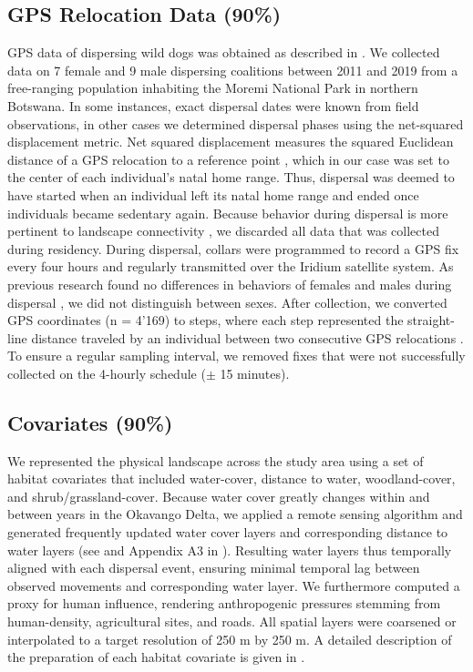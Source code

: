 \documentclass[abstract=on,10pt,a4paper,bibliography=totocnumbered]{article}
\begin{document}
\subsection{GPS Relocation Data (90\%)}
GPS data of dispersing wild dogs was obtained as described in \citep{Cozzi.2020,
Hofmann.2021}. We collected data on 7 female and 9 male dispersing coalitions
between 2011 and 2019 from a free-ranging population inhabiting the Moremi
National Park in northern Botswana. In some instances, exact dispersal dates
were known from field observations, in other cases we determined dispersal
phases using the net-squared displacement metric. Net squared displacement
measures the squared Euclidean distance of a GPS relocation to a reference point
\citep{Borger.2012}, which in our case was set to the center of each
individual's natal home range. Thus, dispersal was deemed to have started when
an individual left its natal home range and ended once individuals became
sedentary again. Because behavior during dispersal is more pertinent to
landscape connectivity \citep{Elliot.2014, Abrahms.2017}, we discarded all data
that was collected during residency. During dispersal, collars were programmed
to record a GPS fix every four hours and regularly transmitted over the Iridium
satellite system. As previous research found no differences in behaviors of
females and males during dispersal \citep{Woodroffe.2019, Cozzi.2020}, we did
not distinguish between sexes. After collection, we converted GPS coordinates (n
= 4'169) to steps, where each step represented the straight-line distance
traveled by an individual between two consecutive GPS relocations
\citep{Turchin.1998}. To ensure a regular sampling interval, we removed fixes
that were not successfully collected on the 4-hourly schedule (\( \pm \) 15
minutes).

\subsection{Covariates (90\%)}
We represented the physical landscape across the study area using a set of
habitat covariates that included water-cover, distance to water, woodland-cover,
and shrub/grassland-cover. Because water cover greatly changes within and
between years in the Okavango Delta, we applied a remote sensing algorithm and
generated frequently updated water cover layers and corresponding distance to
water layers (see \citealp{Wolski.2017} and Appendix A3 in
\citealp{Hofmann.2021}). Resulting water layers thus temporally aligned with
each dispersal event, ensuring minimal temporal lag between observed movements
and corresponding water layer. We furthermore computed a proxy for human
influence, rendering anthropogenic pressures stemming from human-density,
agricultural sites, and roads. All spatial layers were coarsened or interpolated
to a target resolution of 250 m by 250 m. A detailed description of the
preparation of each habitat covariate is given in \cite{Hofmann.2021}.
\end{document}
